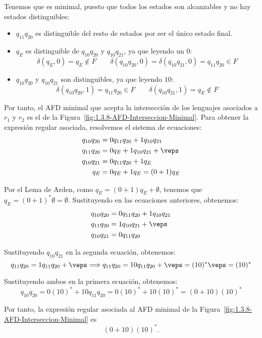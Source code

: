 \begin{ejercicio}
    Tenemos que es minimal, puesto que todos los estados son alcanzables y no hay estados distinguibles:
    \begin{itemize}
        \item $q_{11}q_{20}$ es distinguible del resto de estados por ser el único estado final.
        \item $q_{E}$ es distinguible de $q_{10}q_{20}$ y $q_{10}q_{21}$, ya que leyendo un $0$:
        \begin{equation*}
            \delta(q_{E},0)=q_{E}\notin F\qquad \delta(q_{10}q_{20},0)=\delta(q_{10}q_{21},0)=q_{11}q_{20}\in F
        \end{equation*}

        \item $q_{10}q_{20}$ y $q_{10}q_{21}$ son distinguibles, ya que leyendo $10$:
        \begin{equation*}
            \delta(q_{10}q_{20},1)=q_{11}q_{20}\in F\qquad \delta(q_{10}q_{21},1)=q_{E}\notin F
        \end{equation*}
    \end{itemize}

    Por tanto, el AFD minimal que acepta la intersección de los lenguajes asociados a $r_1$ y $r_2$ es el de la Figura~\ref{fig:1.3.8-AFD-Interseccion-Minimal}. Para obtener la expresión regular asociada, resolvemos el sistema de ecuaciones:
    \begin{align*}
        q_{10}q_{20} &= 0q_{11}q_{20}+1q_{10}q_{21}\\
        q_{11}q_{20} &= 0q_{E}+1q_{10}q_{21} + \veps\\
        q_{10}q_{21} &= 0q_{11}q_{20}+1q_{E}\\
        q_{E} &= 0q_{E}+1q_{E} = (0+1)q_{E}
    \end{align*}

    Por el Lema de Arden, como $q_E = (0+1)q_E + \emptyset$, tenemos que $q_E=(0+1)^*\emptyset = \emptyset$. Sustituyendo en las ecuaciones anteriores, obtenemos:
    \begin{align*}
        q_{10}q_{20} &= 0q_{11}q_{20}+1q_{10}q_{21}\\
        q_{11}q_{20} &= 1q_{10}q_{21} + \veps\\
        q_{10}q_{21} &= 0q_{11}q_{20}
    \end{align*}

    Sustituyendo $q_{10}q_{21}$ en la segunda ecuación, obtenemos:
    \begin{equation*}
        q_{11}q_{20} = 1q_{11}q_{20} + \veps \Longrightarrow q_{11}q_{20} = 10q_{11}q_{20}+ \veps = (10)^*\veps = (10)^*
    \end{equation*}

    Sustituyendo ambos en la primera ecuación, obtenemos:
    \begin{equation*}
        q_{10}q_{20} = 0(10)^* + 10q_{11}q_{20} = 0(10)^* + 10(10)^* = (0+10)(10)^*
    \end{equation*}

    Por tanto, la expresión regular asociada al AFD minimal de la Figura~\ref{fig:1.3.8-AFD-Interseccion-Minimal} es $$(0+10)(10)^*.$$    
\end{ejercicio}

